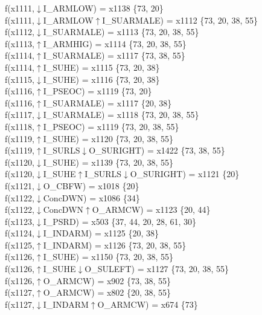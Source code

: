 f(x1111,$\downarrow$I\_ARMLOW) = x1138 \{73, 20\} \\  
f(x1111,$\downarrow$I\_ARMLOW$\uparrow$I\_SUARMALE) = x1112 \{73, 20, 38, 55\} \\  
f(x1112,$\downarrow$I\_SUARMALE) = x1113 \{73, 20, 38, 55\} \\  
f(x1113,$\uparrow$I\_ARMHIG) = x1114 \{73, 20, 38, 55\} \\  
f(x1114,$\uparrow$I\_SUARMALE) = x1117 \{73, 38, 55\} \\  
f(x1114,$\uparrow$I\_SUHE) = x1115 \{73, 20, 38\} \\  
f(x1115,$\downarrow$I\_SUHE) = x1116 \{73, 20, 38\} \\  
f(x1116,$\uparrow$I\_PSEOC) = x1119 \{73, 20\} \\  
f(x1116,$\uparrow$I\_SUARMALE) = x1117 \{20, 38\} \\  
f(x1117,$\downarrow$I\_SUARMALE) = x1118 \{73, 20, 38, 55\} \\  
f(x1118,$\uparrow$I\_PSEOC) = x1119 \{73, 20, 38, 55\} \\  
f(x1119,$\uparrow$I\_SUHE) = x1120 \{73, 20, 38, 55\} \\  
f(x1119,$\uparrow$I\_SURLS$\downarrow$O\_SURIGHT) = x1422 \{73, 38, 55\} \\  
f(x1120,$\downarrow$I\_SUHE) = x1139 \{73, 20, 38, 55\} \\  
f(x1120,$\downarrow$I\_SUHE$\uparrow$I\_SURLS$\downarrow$O\_SURIGHT) = x1121 \{20\} \\  
f(x1121,$\downarrow$O\_CBFW) = x1018 \{20\} \\  
f(x1122,$\downarrow$ConcDWN) = x1086 \{34\} \\  
f(x1122,$\downarrow$ConcDWN$\uparrow$O\_ARMCW) = x1123 \{20, 44\} \\  
f(x1123,$\downarrow$I\_PSRD) = x503 \{37, 44, 20, 28, 61, 30\} \\  
f(x1124,$\downarrow$I\_INDARM) = x1125 \{20, 38\} \\  
f(x1125,$\uparrow$I\_INDARM) = x1126 \{73, 20, 38, 55\} \\  
f(x1126,$\uparrow$I\_SUHE) = x1150 \{73, 20, 38, 55\} \\  
f(x1126,$\uparrow$I\_SUHE$\downarrow$O\_SULEFT) = x1127 \{73, 20, 38, 55\} \\  
f(x1126,$\uparrow$O\_ARMCW) = x902 \{73, 38, 55\} \\  
f(x1127,$\uparrow$O\_ARMCW) = x802 \{20, 38, 55\} \\  
f(x1127,$\downarrow$I\_INDARM$\uparrow$O\_ARMCW) = x674 \{73\} \\  
